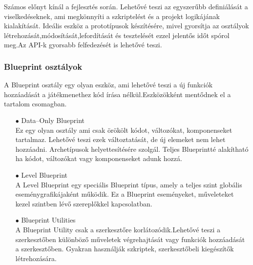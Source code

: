 \documentclass[
]{thesis-ekf}
\theoremstyle{definition}
\theoremstyle{remark}
\begin{document}
Számos előnyt kínál a fejlesztés során. Lehetővé teszi az egyszerűbb definiálását a viselkedéseknek, ami megkönnyíti a szkriptelést és a projekt logikájának kialakítását. Ideális eszköz a prototípusok készítésére, mivel gyorsítja az osztályok létrehozását,módosítását,lefordítását és tesztelését ezzel jelentős időt spórol meg.Az API-k gyorsabb felfedezését is lehetővé teszi.\cite{UnrealBlueprint}
\subsubsection{Blueprint osztályok}
A Blueprint osztály egy olyan eszköz, ami lehetővé teszi a új funkciók hozzáadását a játékmenethez kód írása nélkül.Eszközökként mentődnek el a tartalom csomagban.\cite{UnrealBlueprintClasses}
\begin{itemize}
	\item[$\bullet$] Data--Only Blueprint \\ Ez egy olyan osztály ami csak örökölt kódot, változókat, komponenseket tartalmaz. Lehetővé teszi ezek változtatását, de új elemeket nem lehet hozzáadni. Archetípusok helyettesítésére szolgál. Teljes Blueprintté alakítható ha kódot, változókat vagy komponenseket adunk hozzá.
	\item[$\bullet$] Level Blueprint \\ A Level Blueprint egy speciális Blueprint típus, amely a teljes szint globális eseménygrafikájaként működik. Ez a Blueprint eseményeket, műveleteket kezel szintben lévő szereplőkkel kapcsolatban.
	\item[$\bullet$] Blueprint Utilities \\ A Blueprint Utility csak a szerkesztőre korlátozódik.Lehetővé teszi a szerkesztőben különböző  műveletek végrehajtását vagy funkciók hozzáadását a szerkesztőben. Gyakran használják szkriptek, szerkesztőbeli kiegészítők létrehozására. 
\end{itemize}
\end{document}
